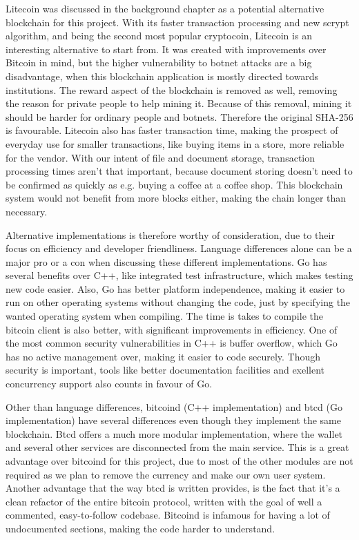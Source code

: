 \documentclass[12pt]{article}
\begin{document}
Litecoin was discussed in the background chapter as a potential alternative blockchain for this project. With its faster transaction processing and new scrypt algorithm, and being the second most popular cryptocoin, Litecoin is an interesting alternative to start from. It was created with improvements over Bitcoin in mind, but the higher vulnerability to botnet attacks are a big disadvantage, when this blockchain application is mostly directed towards institutions. The reward aspect of the blockchain is removed as well, removing the reason for private people to help mining it. Because of this removal, mining it should be harder for ordinary people and botnets. Therefore the original SHA-256 is favourable. Litecoin also has faster transaction time, making the prospect of everyday use for smaller transactions, like buying items in a store, more reliable for the vendor. With our intent of file and document storage, transaction processing times aren't that important, because document storing doesn't need to be confirmed as quickly as e.g. buying a coffee at a coffee shop. This blockchain system would not benefit from more blocks either, making the chain longer than necessary. 

Alternative implementations is therefore worthy of consideration, due to their focus on efficiency and developer friendliness. Language differences alone can be a major pro or a con when discussing these different implementations. Go has several benefits over C++, like integrated test infrastructure, which makes testing new code easier. Also, Go has better platform independence, making it easier to run on other operating systems without changing the code, just by specifying the wanted operating system when compiling. The time is takes to compile the bitcoin client is also better, with significant improvements in efficiency. One of the most common security vulnerabilities in C++ is buffer overflow, which Go has no active management over, making it easier to code securely. Though security is important, tools like better documentation facilities and exellent concurrency support also counts in favour of Go. 

Other than language differences, bitcoind (C++ implementation) and btcd (Go implementation)
have several differences even though they implement the same blockchain. Btcd offers a much more modular implementation, where the wallet and several other services are disconnected from the main service. This is a great advantage over bitcoind for this project, due to most of the other modules are not required as we plan to remove the currency and make our own user system. Another advantage that the way btcd is written provides, is the fact that it's a clean refactor of the entire bitcoin protocol, written with the goal of well a commented, easy-to-follow codebase. Bitcoind is infamous for having a lot of undocumented sections, making the code harder to understand. 
 
\end{document}

